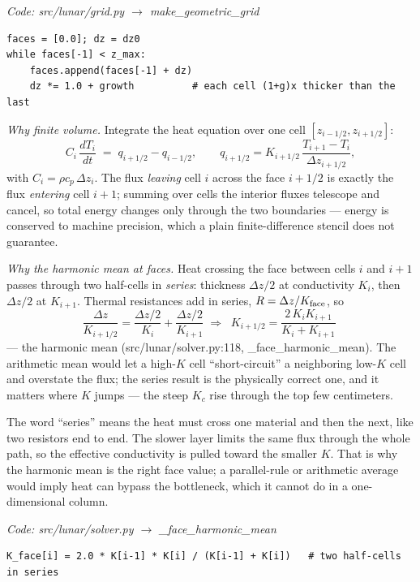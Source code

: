 \documentclass[11pt]{report}
\newcommand{\code}[1]{{\ttfamily\small #1}}
\begin{document}
{\small\color{dim}\textit{Code: \code{src/lunar/grid.py} $\to$ \code{make\_geometric\_grid}}}
\begin{lstlisting}[style=py]
faces = [0.0]; dz = dz0
while faces[-1] < z_max:
    faces.append(faces[-1] + dz)
    dz *= 1.0 + growth          # each cell (1+g)x thicker than the last
\end{lstlisting}

\emph{Why finite volume.} Integrate the heat equation over one cell
$[z_{i-1/2},z_{i+1/2}]$:
\[
C_i\,\frac{dT_i}{dt} \;=\; q_{i+1/2}-q_{i-1/2},\qquad
q_{i+1/2}=K_{i+1/2}\,\frac{T_{i+1}-T_i}{\Delta z_{i+1/2}},
\]
with $C_i=\rho c_p\,\Delta z_i$. The flux \emph{leaving} cell $i$ across the face
$i{+}1/2$ is exactly the flux \emph{entering} cell $i{+}1$; summing over cells the
interior fluxes telescope and cancel, so total energy changes only through the
two boundaries --- energy is conserved to machine precision, which a plain
finite-difference stencil does not guarantee.

\emph{Why the harmonic mean at faces.} Heat crossing the face between cells $i$
and $i{+}1$ passes through two half-cells in \emph{series}: thickness
$\Delta z/2$ at conductivity $K_i$, then $\Delta z/2$ at $K_{i+1}$. Thermal
resistances add in series, $R=\Delta z/K_{\rm face}$, so
\[
\frac{\Delta z}{K_{i+1/2}} = \frac{\Delta z/2}{K_i}+\frac{\Delta z/2}{K_{i+1}}
\;\Rightarrow\;
\boxed{\;K_{i+1/2}=\frac{2\,K_i K_{i+1}}{K_i+K_{i+1}}\;}
\]
--- the harmonic mean (\code{src/lunar/solver.py:118},
\code{\_face\_harmonic\_mean}). The arithmetic mean would let a high-$K$ cell
``short-circuit'' a neighboring low-$K$ cell and overstate the flux; the series
result is the physically correct one, and it matters where $K$ jumps --- the
steep $K_c$ rise through the top few centimeters.

\begin{plain}
The word ``series'' means the heat must cross one material and then the next,
like two resistors end to end. The slower layer limits the same flux through the
whole path, so the effective conductivity is pulled toward the smaller $K$.
That is why the harmonic mean is the right face value; a parallel-rule or
arithmetic average would imply heat can bypass the bottleneck, which it cannot
do in a one-dimensional column.
\end{plain}

{\small\color{dim}\textit{Code: \code{src/lunar/solver.py} $\to$ \code{\_face\_harmonic\_mean}}}
\begin{lstlisting}[style=py]
K_face[i] = 2.0 * K[i-1] * K[i] / (K[i-1] + K[i])   # two half-cells in series
\end{lstlisting}
\end{document}
